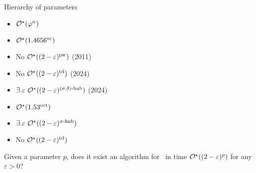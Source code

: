 \begin{frame}{Hierarchy of parameters}
    \begin{minipage}{0.5\textwidth}
        \centering
        
    \end{minipage}
    \begin{minipage}{0.47\textwidth}
        \begin{itemize}
            \item<3-> $\mathcal{O}^\star(\varphi^n)$
            \item<4-> $\mathcal{O}^\star(1.4656^{\text{vc}})$
            \item<5-> No $\mathcal{O}^\star((2 - \varepsilon)^{\text{pw}})$ (2011)
            \item<6-> No $\mathcal{O}^\star((2 - \varepsilon)^{\text{td}})$ (2024)
            \item<7-> $\exists. \varepsilon\ \mathcal{O}^\star((2 - \varepsilon)^{(\sigma, \delta)\text{-hub}})$ (2024)
        \end{itemize}

        \medskip

        \begin{itemize}
            \item<8-> \color{red} $\mathcal{O}^\star(1.53^{\text{oct}})$
            \item<9-> \color{red} $\exists. \varepsilon\ \mathcal{O}^\star((2 - \varepsilon)^{\sigma\text{-hub}})$
            \item<10-> \color{red} No $\mathcal{O}^\star((2 - \varepsilon)^{\text{td}})$
        \end{itemize}
    \end{minipage}

    \medskip

    \pause 

    Given a parameter $p$, does it exist an algorithm for \IS\ in time $\mathcal{O}^\star((2-\varepsilon)^p)$ for any $\varepsilon > 0$?
\end{frame}